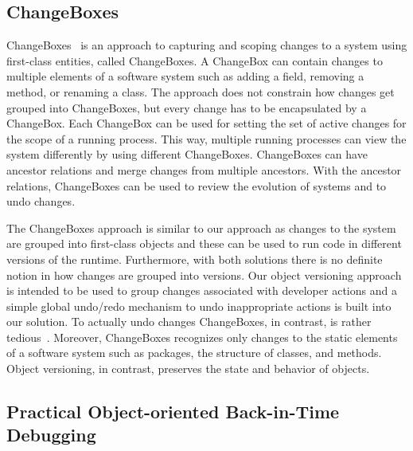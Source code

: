 \subsection{ChangeBoxes}

ChangeBoxes~\cite{Denker2007EEC} is an approach to capturing and scoping changes to a system using first-class entities, called ChangeBoxes.
A ChangeBox can contain changes to multiple elements of a software system such as adding a field, removing a method, or renaming a class.
The approach does not constrain how changes get grouped into ChangeBoxes, but every change has to be encapsulated by a ChangeBox.
Each ChangeBox can be used for setting the set of active changes for the scope of a running process.
This way, multiple running processes can view the system differently by using different ChangeBoxes.
ChangeBoxes can have ancestor relations and merge changes from multiple ancestors.
With the ancestor relations, ChangeBoxes can be used to review the evolution of systems and to undo changes.

The ChangeBoxes approach is similar to our approach as changes to the system are grouped into first-class objects and these can be used to run code in different versions of the runtime.
Furthermore, with both solutions there is no definite notion in how changes are grouped into versions.
Our object versioning approach is intended to be used to group changes associated with developer actions and a simple global undo/redo mechanism to undo inappropriate actions is built into our solution.
To actually undo changes ChangeBoxes, in contrast, is rather tedious~\cite{Steinert2012COE}.
Moreover, ChangeBoxes recognizes only changes to the static elements of a software system such as packages, the structure of classes, and methods.
Object versioning, in contrast, preserves the state and behavior of objects.


\subsection{Practical Object-oriented Back-in-Time Debugging}

